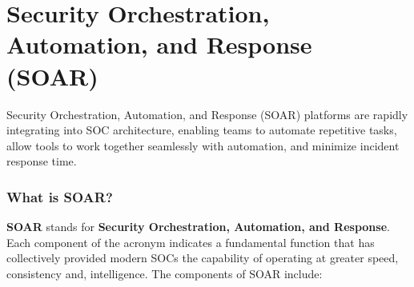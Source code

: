 \chapter{Security Orchestration, Automation, and Response (SOAR)}

Security Orchestration, Automation, and Response (SOAR) platforms are rapidly integrating into SOC architecture, enabling teams to automate repetitive tasks, allow tools to work together seamlessly with automation, and minimize incident response time.

\subsection*{What is SOAR?}

\textbf{SOAR} stands for \textbf{Security Orchestration, Automation, and Response}. Each component of the acronym indicates a fundamental function that has collectively provided modern SOCs the capability of operating at greater speed, consistency and, intelligence. The components of SOAR include: 

